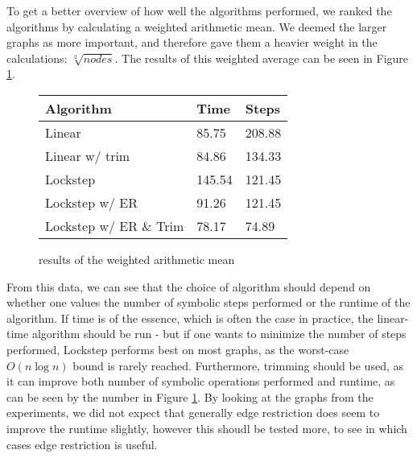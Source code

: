 \documentclass[../master/master.tex]{subfiles}
\begin{document}
To get a better overview of how well the algorithms performed, we ranked the algorithms by calculating a weighted arithmetic mean. We deemed the larger graphs as more important, and therefore gave them a heavier weight in the calculations: $\sqrt[2]{nodes}$. The results of this weighted average can be seen in Figure \ref{mean}.

\begin{figure}[h]
  \centering
  \begin{tabular}{|l|l|l|}
    \hline
    Algorithm              & Time   & Steps  \\
    \hline
    Linear                 & 85.75  & 208.88 \\
    \hline
    Linear w/ trim         & 84.86  & 134.33 \\
    \hline
    Lockstep               & 145.54 & 121.45 \\
    \hline
    Lockstep w/ ER         & 91.26  & 121.45 \\
    \hline
    Lockstep w/ ER \& Trim & 78.17  & 74.89 \\
    \hline
\end{tabular}
\caption{results of the weighted arithmetic mean}\label{mean}
\end{figure}

From this data, we can see that the choice of algorithm should depend on whether one values the number of symbolic steps performed or the runtime of the algorithm. If time is of the essence, which is often the case in practice, the linear-time algorithm should be run - but if one wants to minimize the number of steps performed, Lockstep performs best on most graphs, as the worst-case $O(n\log n)$ bound is rarely reached. Furthermore, trimming should be used, as it can improve both number of symbolic operations performed and runtime, as can be seen by the number in Figure \ref{mean}. By looking at the graphs from the experiments, we did not expect that generally edge restriction does seem to improve the runtime slightly, however this shoudl be tested more, to see in which cases edge restriction is useful.
\end{document}
